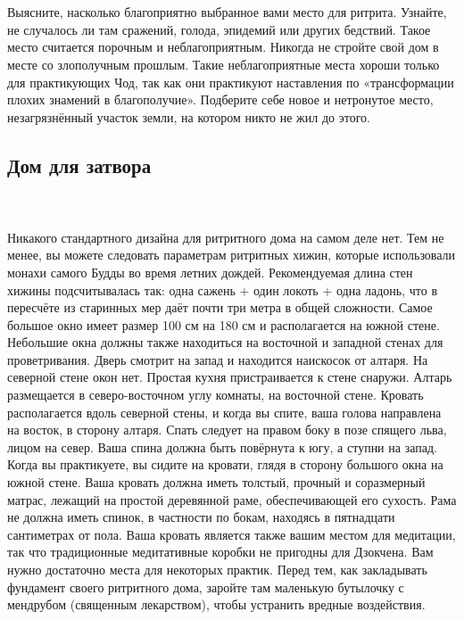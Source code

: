 \\ \\ Выясните, насколько благоприятно выбранное вами место для ритрита. Узнайте, не случалось ли там сражений, голода, эпидемий или других бедствий. Такое место считается порочным и неблагоприятным. Никогда не стройте свой дом в месте со злополучным прошлым. Такие неблагоприятные места хороши только для практикующих Чод, так как они практикуют наставления по «трансформации плохих знамений в благополучие». Подберите себе новое и нетронутое место, незагрязнённый участок земли, на котором никто не жил до этого.
\subsection{Дом для затвора}
\\ \\ Никакого стандартного дизайна для ритритного дома на самом деле нет. Тем не менее, вы можете следовать параметрам ритритных хижин, которые использовали монахи самого Будды во время летних дождей. Рекомендуемая длина стен хижины подсчитывалась так: одна сажень + один локоть + одна ладонь, что в пересчёте из старинных мер даёт почти три метра в общей сложности. Самое большое окно имеет размер 100 см на 180 см и располагается на южной стене. Небольшие окна должны также находиться на восточной и западной стенах для проветривания. Дверь смотрит на запад и находится наискосок от алтаря. На северной стене окон нет. Простая кухня пристраивается к стене снаружи. Алтарь размещается в северо-восточном углу комнаты, на восточной стене. Кровать располагается вдоль северной стены, и когда вы спите, ваша голова направлена на восток, в сторону алтаря. Спать следует на правом боку в позе спящего льва, лицом на север. Ваша спина должна быть повёрнута к югу, а ступни на запад. Когда вы практикуете, вы сидите на кровати, глядя в сторону большого окна на южной стене. Ваша кровать должна иметь толстый, прочный и соразмерный матрас, лежащий на простой деревянной раме, обеспечивающей его сухость. Рама не должна иметь спинок, в частности по бокам, находясь в пятнадцати сантиметрах от пола. Ваша кровать является также вашим местом для медитации, так что традиционные медитативные коробки не пригодны для Дзокчена. Вам нужно достаточно места для некоторых практик. Перед тем, как закладывать фундамент своего ритритного дома, заройте там маленькую бутылочку с мендрубом (священным лекарством), чтобы устранить вредные воздействия.
\\ \\
